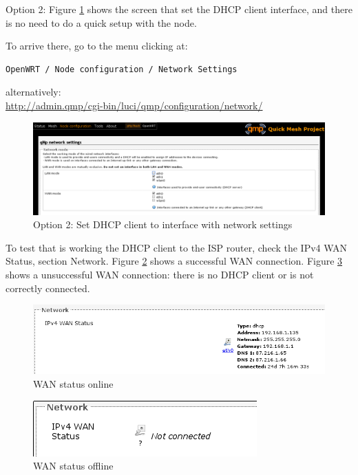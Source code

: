 \documentclass[11pt]{article}
\begin{document}
Option 2: Figure \ref{fig:netset} shows the screen that set the DHCP client
interface, and there is no need to do a quick setup with the node.

\noindent
To arrive there, go to the menu clicking at:
\begin{verbatim}
OpenWRT / Node configuration / Network Settings
\end{verbatim}
alternatively:\\
\url{http://admin.qmp/cgi-bin/luci/qmp/configuration/network/}

\begin{figure}[htb]
\centering
\includegraphics[width=.9\linewidth]{./img/qMp-basics-scrot/network_settings.png}
\caption{\label{fig:netset}Option 2: Set DHCP client to interface with network settings}
\end{figure}

To test that is working the DHCP client to the ISP router, check the
IPv4 WAN Status, section Network. Figure \ref{fig:wan-status-on-detail} shows a
successful WAN connection. Figure \ref{fig:wan-status-off} shows a
unsuccessful WAN connection: there is no DHCP client or is not
correctly connected.

\begin{figure}[htb]
\centering
\includegraphics[width=.9\linewidth]{./img/qMp-basics-scrot/status-wan_status_detail.png}
\caption{\label{fig:wan-status-on-detail}WAN status online}
\end{figure}

\begin{figure}[htb]
\centering
\includegraphics[width=.9\linewidth]{./img/qMp-basics-scrot/wan_not_connected.png}
\caption{\label{fig:wan-status-off}WAN status offline}
\end{figure}
\end{document}
